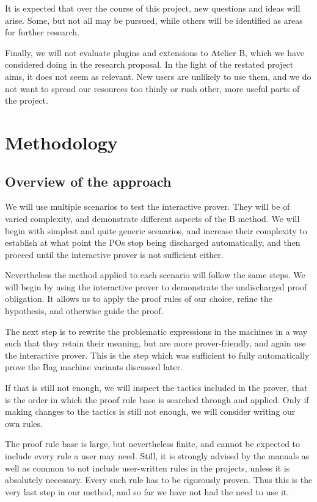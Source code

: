 \documentclass[11pt,journal]{IEEEtran}
\begin{document}
	It is expected that over the course of this project, new questions and ideas will arise. Some, but not all may be pursued, while others will be identified as areas for further research.
	
	Finally, we will not evaluate plugins and extensions to Atelier B, which we have considered doing in the research proposal. In the light of the restated project aims, it does not seem as relevant. New users are unlikely to use them, and we do not want to spread our resources too thinly or rush other, more useful parts of the project.

		
	\section{Methodology}
	\subsection{Overview of the approach}

	We will use multiple scenarios to test the interactive prover. They will be of varied complexity, and demonstrate different aspects of the B method. We will begin with simplest and quite generic scenarios, and increase their complexity to establish at what point the POs stop being discharged automatically, and then proceed until the interactive prover is not sufficient either. 
	
	Nevertheless the method applied to each scenario will follow the same steps. We will begin by using the interactive prover to demonstrate the undischarged proof obligation. It allows us to apply the proof rules of our choice, refine the hypothesis, and otherwise guide the proof.
	
	The next step is to rewrite the problematic expressions in the machines in a way such that they retain their meaning, but are more prover-friendly, and again use the interactive prover. This is the step which was sufficient to fully automatically prove the Bag machine variants discussed later.
	
	If that is still not enough, we will inspect the tactics included in the prover, that is the order in which the proof rule base is searched through and applied. Only if making changes to the tactics is still not enough, we will consider writing our own rules.
	
	The proof rule base is large, but nevertheless finite, and cannot be expected to include every rule a user may need. Still, it is strongly advised by the manuals as well as common to not include user-written rules in the projects, unless it is absolutely necessary. Every such rule has to be rigorously proven. Thus this is the very last step in our method, and so far we have not had the need to use it. 
	
\end{document}
